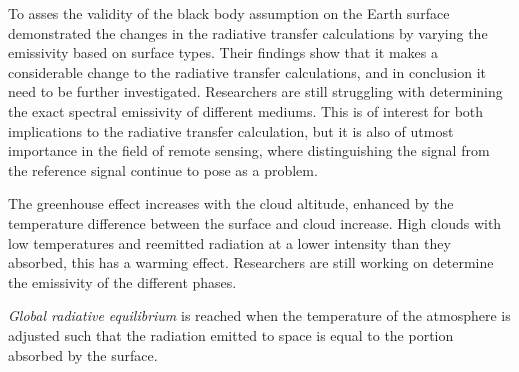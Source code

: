     To asses the validity of the black body assumption on the Earth surface \citeauthor{Huang2018ImprovedClimate} demonstrated the changes in the radiative transfer calculations by varying the emissivity based on surface types. Their findings show that it makes a considerable change to the radiative transfer calculations, and in conclusion it need to be further investigated. Researchers are still struggling with determining the exact spectral emissivity of different mediums. This is of interest for both implications to the radiative transfer calculation, but it is also of utmost importance in the field of remote sensing, where distinguishing the signal from the reference signal continue to pose as a problem.

The greenhouse effect increases with the cloud altitude, enhanced by the temperature difference between the surface and cloud increase. High clouds with low temperatures and reemitted radiation at a lower intensity than they absorbed, this has a warming effect. Researchers are still working on determine the emissivity of the different phases. 

\textit{Global radiative equilibrium} is reached when the temperature of the atmosphere is adjusted such that the radiation emitted to space is equal to the portion absorbed by the surface.



